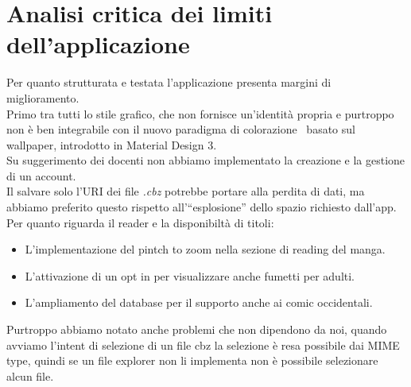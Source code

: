 \documentclass[../Assignment-3-LPSMT.tex]{subfiles}
\begin{document}
\chapter{Analisi critica dei limiti dell’applicazione}

Per quanto strutturata e testata l'applicazione presenta margini di miglioramento.\\
Primo tra tutti lo stile grafico, che non fornisce un'identità propria e purtroppo non è ben integrabile con il nuovo paradigma di colorazione~\cite{matDesColor} basato sul wallpaper, introdotto in Material Design 3.\\
Su suggerimento dei docenti non abbiamo implementato la creazione e la gestione di un account.\\
Il salvare solo l'URI dei file \emph{.cbz} potrebbe portare alla perdita di dati, ma abbiamo preferito questo rispetto all'``esplosione'' dello spazio richiesto dall'app.\\
Per quanto riguarda il reader e la disponibiltà di titoli:
\begin{itemize}
  \item L'implementazione del pintch to zoom nella sezione di reading del manga.
  \item L'attivazione di un opt in per visualizzare anche fumetti per adulti.
  \item L'ampliamento del database per il supporto anche ai comic occidentali.
\end{itemize}
Purtroppo abbiamo notato anche problemi che non dipendono da noi, quando avviamo l'intent di selezione di un file cbz la selezione è resa possibile dai MIME type, quindi se un file explorer non li implementa non è possibile selezionare alcun file.\\
\end{document}
